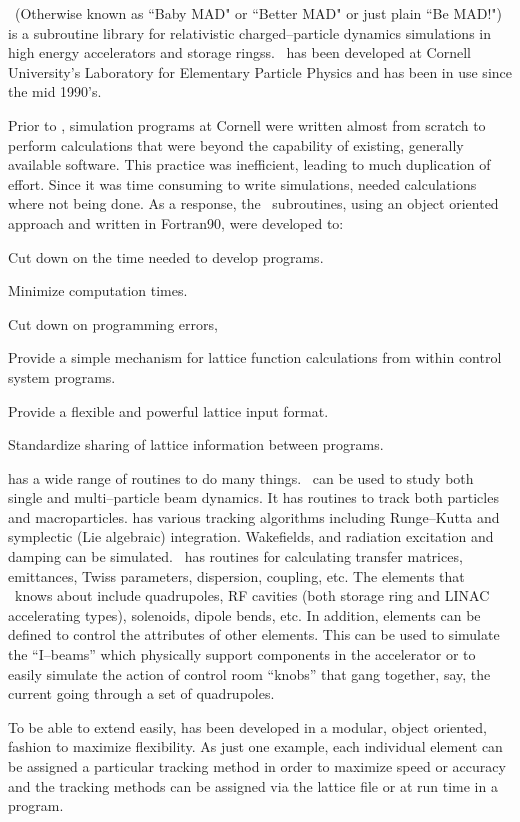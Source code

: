 
\bmad\ (Otherwise known as ``Baby MAD" or ``Better MAD" or just plain
``Be MAD!")  is a subroutine library for relativistic
charged--particle dynamics simulations in high energy accelerators and
storage ringss. \bmad\ has been developed at Cornell University's
Laboratory for Elementary Particle Physics and has been in use since
the mid 1990's. 

Prior to \bmad, simulation programs at Cornell were written almost from 
scratch to perform
calculations that were beyond the capability of existing, generally
available software. This practice was inefficient, leading to much
duplication of effort.  Since it was time consuming to write
simulations, needed calculations where not being done.  As a response,
the \bmad\ subroutines, using an object oriented approach and written
in Fortran90, were developed to:
\begin{Itemize}
\item Cut down on the time needed to develop programs.
\item Minimize computation times.
\item Cut down on programming errors, 
\item Provide a simple mechanism for lattice function calculations
from within control system programs.
\item Provide a flexible and powerful lattice input format.
\item Standardize sharing of lattice information between 
programs.
\end{Itemize}

\bmad has a wide range of routines to do many things.  \bmad\ can be
used to study both single and multi--particle beam dynamics.  It has
routines to track both particles and macroparticles. \bmad has various
tracking algorithms including Runge--Kutta and symplectic (Lie
algebraic) integration.  Wakefields, and radiation excitation and
damping can be simulated. \bmad\ has routines for calculating transfer
matrices, emittances, Twiss parameters, dispersion, coupling, etc. The
elements that \bmad\ knows about include quadrupoles, RF cavities
(both storage ring and LINAC accelerating types), solenoids, dipole
bends, etc. In addition, elements can be defined to control the
attributes of other elements. This can be used to simulate the
``I--beams'' which physically support components in the accelerator
 or to easily simulate the action of control room ``knobs''
that gang together, say, the current going through a set of quadrupoles.

To be able to extend \bmad easily, \bmad has been developed
in a modular, object oriented, fashion to maximize flexibility. As just one 
example, each individual element can be assigned a particular tracking method
in order to maximize speed or accuracy and the tracking methods can be assigned
via the lattice file or at run time in a program.


\vfill
\break
